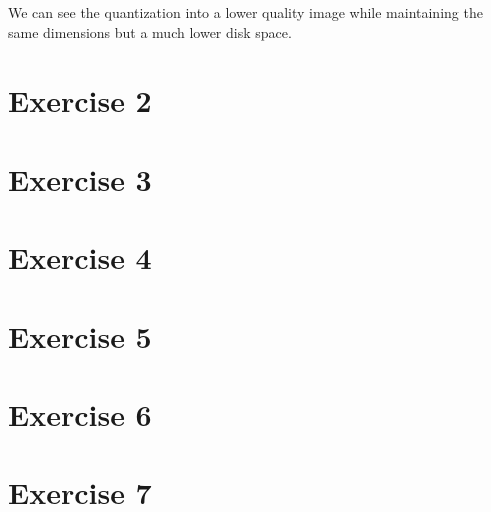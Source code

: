 \documentclass[12pt, a4paper]{article}
\begin{document}
\begin{multicols}{2}

    \begin{table}[H]
        \caption{Comparison of Images}\label{tab:comp}
        \begin{center}
        \end{center}
    \end{table}

    We can see the quantization into a lower quality image while maintaining the same dimensions but a much lower disk space.
    \newline

    \section{Exercise 2} \label{sec:ex2}
    \section{Exercise 3} \label{sec:ex3}
    \section{Exercise 4} \label{sec:ex4}
    \section{Exercise 5} \label{sec:ex5}
    \section{Exercise 6} \label{sec:ex6}
    \section{Exercise 7} \label{sec:ex7}

    \printbibliography

\end{multicols}
\end{document}
